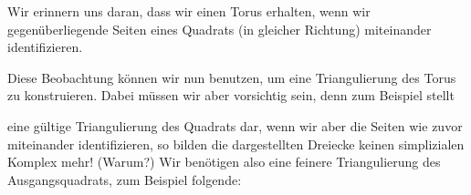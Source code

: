 \begin{thBeispiel}
    Wir erinnern uns daran, dass wir einen Torus erhalten, wenn wir
    gegenüberliegende Seiten eines Quadrats (in gleicher Richtung) miteinander
    identifizieren.
    \begin{center}
        \newcommand{\myarrow}[1][0]{%
            \tikz\draw[-triangle 90] (0,0) -- (#1:0.01pt);
        }
    \end{center}
    Diese Beobachtung können wir nun benutzen, um eine Triangulierung des Torus
    zu konstruieren. Dabei müssen wir aber vorsichtig sein, denn zum Beispiel
    stellt 
    \begin{center}
    \end{center}
    eine gültige Triangulierung des Quadrats dar, wenn wir aber die Seiten wie
    zuvor miteinander identifizieren, so bilden die dargestellten Dreiecke
    keinen simplizialen Komplex mehr! (Warum?) Wir benötigen also eine feinere
    Triangulierung des Ausgangsquadrats, zum Beispiel folgende:
    \begin{center}
\end{center}
\end{thBeispiel}
